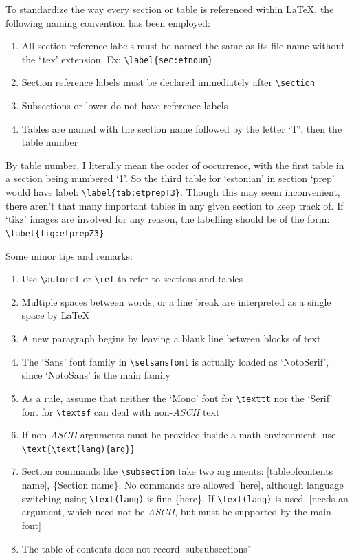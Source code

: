 \documentclass[12pt,twoside]{article}
\newenvironment{example}{\def\FrameCommand{\colorbox{sampler}} \MakeFramed{\advance\hsize+\width}\begin{center}}{\end{center}\endMakeFramed}
\begin{document}
To standardize the way every section or table is referenced within \LaTeX, the following naming convention has been employed:
\begin{enumerate}
    \item All section reference labels must be named  the same as its file name without the `.tex' extension. Ex: \verb|\label{sec:etnoun}|
    \item Section reference labels must be declared immediately after  \verb|\section|
    \item Subsections or lower do not have reference labels
    \item Tables are named with the section name followed by the letter `T', then the table number 
\end{enumerate}
By table number, I literally mean the order of occurrence, with the first table in a section being numbered `1'. So the third table for `estonian' in section `prep' would have label: \verb|\label{tab:etprepT3}|. Though this may seem inconvenient, there aren't that many important tables in any given section to keep track of. If `tikz' images are involved for any reason, the labelling  should be of the form: \verb|\label{fig:etprepZ3}|

Some minor tips and remarks:
\begin{example}
    \begin{enumerate}
        \item Use \verb|\autoref| or \verb|\ref| to refer to sections and tables
        \item Multiple spaces between words, or a line break are interpreted as a single space by \LaTeX
        \item A new paragraph begins by leaving a blank line between blocks of text
        \item The `Sans' font family in \verb|\setsansfont| is actually loaded as `NotoSerif', since `NotoSans' is the main family
        \item As a rule, assume that neither the `Mono' font for \verb|\texttt| nor the `Serif' font for \verb|\textsf| can deal with non-\textit{ASCII} text
        \item If non-\textit{ASCII} arguments must be provided inside a math environment, use \verb|\text{\text(lang){arg}}|
        \item Section commands like \verb|\subsection| take two arguments: [tableofcontents name], \{Section name\}. No commands are allowed [here], although language switching using \verb|\text(lang)| is fine \{here\}. If \verb|\text(lang)| is used, [needs an argument, which need not be \textit{ASCII}, but must be supported by the main font]
        \item The table of contents does not record `subsubsections'
    \end{enumerate}
\end{example}
\end{document}
